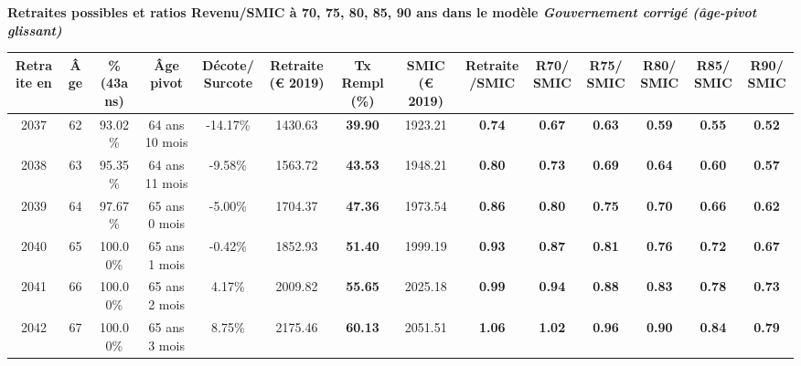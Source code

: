  \vspace{0.1cm} 
{\bf \noindent Retraites possibles et ratios Revenu/SMIC à 70, 75, 80, 85, 90 ans dans le modèle \emph{Gouvernement corrigé (âge-pivot glissant)}}  
 
\begin{adjustbox}{max width=\textwidth} 
\begin{tabular}[htb]{|c|c||c|c|c||c|c||c|c||c|c|c|c|c|} 
\hline 
 Retraite en &  Âge &  \%(43ans) &  Âge pivot &  Décote/Surcote &  Retraite (\euro{} 2019) &  Tx Rempl(\%) &  SMIC (\euro{} 2019) &  Retraite/SMIC &  R70/SMIC &  R75/SMIC &  R80/SMIC &  R85/SMIC &  R90/SMIC \\ 
\hline \hline 
 2037 &  62 &  93.02\% &  64 ans 10 mois &  -14.17\% &  1430.63 &  {\bf 39.90} &  1923.21 &  {\bf {\color{red} 0.74}} &  {\bf {\color{red} 0.67}} &  {\bf {\color{red} 0.63}} &  {\bf {\color{red} 0.59}} &  {\bf {\color{red} 0.55}} &  {\bf {\color{red} 0.52}} \\ 
\hline 
 2038 &  63 &  95.35\% &  64 ans 11 mois &  -9.58\% &  1563.72 &  {\bf 43.53} &  1948.21 &  {\bf {\color{red} 0.80}} &  {\bf {\color{red} 0.73}} &  {\bf {\color{red} 0.69}} &  {\bf {\color{red} 0.64}} &  {\bf {\color{red} 0.60}} &  {\bf {\color{red} 0.57}} \\ 
\hline 
 2039 &  64 &  97.67\% &  65 ans 0 mois &  -5.00\% &  1704.37 &  {\bf 47.36} &  1973.54 &  {\bf {\color{red} 0.86}} &  {\bf {\color{red} 0.80}} &  {\bf {\color{red} 0.75}} &  {\bf {\color{red} 0.70}} &  {\bf {\color{red} 0.66}} &  {\bf {\color{red} 0.62}} \\ 
\hline 
 2040 &  65 &  100.00\% &  65 ans 1 mois &  -0.42\% &  1852.93 &  {\bf 51.40} &  1999.19 &  {\bf {\color{red} 0.93}} &  {\bf {\color{red} 0.87}} &  {\bf {\color{red} 0.81}} &  {\bf {\color{red} 0.76}} &  {\bf {\color{red} 0.72}} &  {\bf {\color{red} 0.67}} \\ 
\hline 
 2041 &  66 &  100.00\% &  65 ans 2 mois &  4.17\% &  2009.82 &  {\bf 55.65} &  2025.18 &  {\bf {\color{red} 0.99}} &  {\bf {\color{red} 0.94}} &  {\bf {\color{red} 0.88}} &  {\bf {\color{red} 0.83}} &  {\bf {\color{red} 0.78}} &  {\bf {\color{red} 0.73}} \\ 
\hline 
 2042 &  67 &  100.00\% &  65 ans 3 mois &  8.75\% &  2175.46 &  {\bf 60.13} &  2051.51 &  {\bf 1.06} &  {\bf 1.02} &  {\bf {\color{red} 0.96}} &  {\bf {\color{red} 0.90}} &  {\bf {\color{red} 0.84}} &  {\bf {\color{red} 0.79}} \\ 
\hline 
\hline 
\end{tabular} 
\end{adjustbox} 
 
